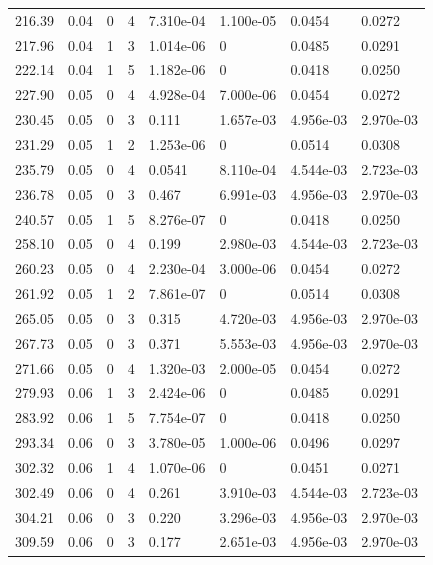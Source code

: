 \documentclass[preview]{standalone}
\begin{document}
{{{\begin{tabular}{L{1.2cm}C{1.2cm} C{0.3cm}C{0.5cm} C{1.4cm}C{1.4cm} C{1.4cm}C{1.4cm}}
  216.39  &  0.04  & 0     &  4 &  7.310e-04  & 1.100e-05  & 0.0454 &  0.0272   \\ 
  217.96  &  0.04  & 1     &  3 &  1.014e-06  & 0  & 0.0485 &  0.0291   \\ 
  222.14  &  0.04  & 1     &  5 &  1.182e-06  & 0  & 0.0418 &  0.0250   \\ 
  227.90  &  0.05  & 0     &  4 &  4.928e-04  & 7.000e-06  & 0.0454 &  0.0272   \\ 
  230.45  &  0.05  & 0     &  3 &  0.111  & 1.657e-03  & 4.956e-03 &  2.970e-03   \\ 
  231.29  &  0.05  & 1     &  2 &  1.253e-06  & 0  & 0.0514 &  0.0308   \\ 
  235.79  &  0.05  & 0     &  4 &  0.0541  & 8.110e-04  & 4.544e-03 &  2.723e-03   \\ 
  236.78  &  0.05  & 0     &  3 &  0.467  & 6.991e-03  & 4.956e-03 &  2.970e-03   \\ 
  240.57  &  0.05  & 1     &  5 &  8.276e-07  & 0  & 0.0418 &  0.0250   \\ 
  258.10  &  0.05  & 0     &  4 &  0.199  & 2.980e-03  & 4.544e-03 &  2.723e-03   \\ 
  260.23  &  0.05  & 0     &  4 &  2.230e-04  & 3.000e-06  & 0.0454 &  0.0272   \\ 
  261.92  &  0.05  & 1     &  2 &  7.861e-07  & 0  & 0.0514 &  0.0308   \\ 
  265.05  &  0.05  & 0     &  3 &  0.315  & 4.720e-03  & 4.956e-03 &  2.970e-03   \\ 
  267.73  &  0.05  & 0     &  3 &  0.371  & 5.553e-03  & 4.956e-03 &  2.970e-03   \\ 
  271.66  &  0.05  & 0     &  4 &  1.320e-03  & 2.000e-05  & 0.0454 &  0.0272   \\ 
  279.93  &  0.06  & 1     &  3 &  2.424e-06  & 0  & 0.0485 &  0.0291   \\ 
  283.92  &  0.06  & 1     &  5 &  7.754e-07  & 0  & 0.0418 &  0.0250   \\ 
  293.34  &  0.06  & 0     &  3 &  3.780e-05  & 1.000e-06  & 0.0496 &  0.0297   \\ 
  302.32  &  0.06  & 1     &  4 &  1.070e-06  & 0  & 0.0451 &  0.0271   \\ 
  302.49  &  0.06  & 0     &  4 &  0.261  & 3.910e-03  & 4.544e-03 &  2.723e-03   \\ 
  304.21  &  0.06  & 0     &  3 &  0.220  & 3.296e-03  & 4.956e-03 &  2.970e-03   \\ 
  309.59  &  0.06  & 0     &  3 &  0.177  & 2.651e-03  & 4.956e-03 &  2.970e-03   \\ 

\end{tabular}}}}
\end{document}
